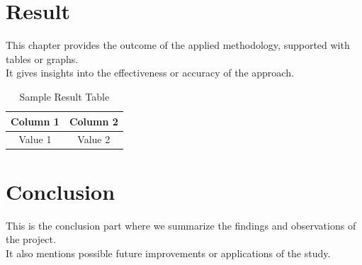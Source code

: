\documentclass{report}
\begin{document}
	\chapter{Result}
	This chapter provides the outcome of the applied methodology, supported with tables or graphs. \\
	It gives insights into the effectiveness or accuracy of the approach.
	\begin{table}[h]
		\centering
		\begin{tabular}{|c|c|}
			\hline
			Column 1 & Column 2 \\
			\hline
			Value 1 & Value 2 \\
			\hline
		\end{tabular}
		\caption{Sample Result Table}
	\end{table}
	
	\chapter{Conclusion}
	This is the conclusion part where we summarize the findings and observations of the project.\cite{berry2001introduction} \\
	It also mentions possible future improvements or applications of the study.
	
	
	
\end{document}
